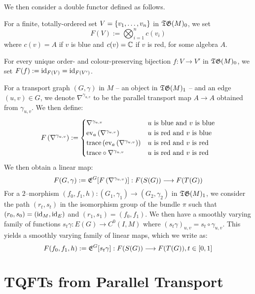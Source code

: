 \documentclass[./Thick_TQFTs_and_Quantum_Information.tex]{subfiles}
\begin{document}
We then consider a double functor defined as follows.

\begin{defn}
For a finite, totally-ordered set $V = \set{v_1, \dots, v_n}$ in $\mathfrak{TG}(M)_0$, we
set
\[
  F(V) := \bigotimes_{i = 1}^{n} c(v_i)
\]
where $c(v) = A$ if $v$ is blue and $c(v) = \mathbb{C}$ if $v$ is red,
for some algebra $A$.

For every unique order- and colour-preserving bijection $f : V \to V'$ in
$\mathfrak{TG}(M)_0$, we set $F(f) := \text{id}_{F(V)} = \text{id}_{F(V')}$.

For a transport graph $(G, \gamma)$ in $M$ -- an object in $\mathfrak{TG}(M)_1$ -- and an
edge $(u, v) \in G$, we denote $\nabla^{\gamma_{u, v}}$ to be the parallel
transport map $A \to A$ obtained from $\gamma_{u, v}$. We then define:
\[
  F\left( \nabla^{\gamma_{u, v}} \right) := \begin{cases}
    \nabla^{\gamma_{u, v}}
      & u \text{ is blue and } v \text{ is blue} \\
    \text{ev}_{a}\left( \nabla^{\gamma_{u, v}} \right)
      & u \text{ is red and } v \text{ is blue} \\
    \text{trace}\left( \text{ev}_{a}\left( \nabla^{\gamma_{u, v}} \right) \right)
      & u \text{ is red and } v \text{ is red} \\
    \text{trace} \circ \nabla^{\gamma_{u, v}}
      & u \text{ is red and } v \text{ is red}
  \end{cases}
\]
We then obtain a linear map:
\[
  F(G, \gamma) := \mathfrak{E}^{G}[F\left( \nabla^{\gamma_{u, v}} \right)]
    : F(S(G)) \stackrel{}{\longrightarrow} F(T(G))
\]
For a $2$--morphism
$(f_0, f_1, h) : (G_1, \gamma_1) \to (G_2, \gamma_2)$ in $\mathfrak{TG}(M)_1$, we consider
the path $(r_t, s_t)$ in the isomorphism group of the bundle $\pi$ such that
$(r_0, s_0) = (\text{id}_M, \text{id}_E)$ and $(r_1, s_1) = (f_0, f_1)$. We then have a
smoothly varying family of functions $s_t\gamma : E(G) \to C^0(I, M)$
where $(s_t\gamma)_{u, v} = s_t \circ \gamma_{u, v}$. This yields a smoothly
varying family of linear maps, which we write as:
\[
  F(f_0, f_1, h) := \mathfrak{E}^{G}[s_t\gamma]
    : F(S(G)) \stackrel{}{\longrightarrow} F(T(G)), t \in [0, 1]
\]
\end{defn}



\section{TQFTs from Parallel Transport}
\end{document}
